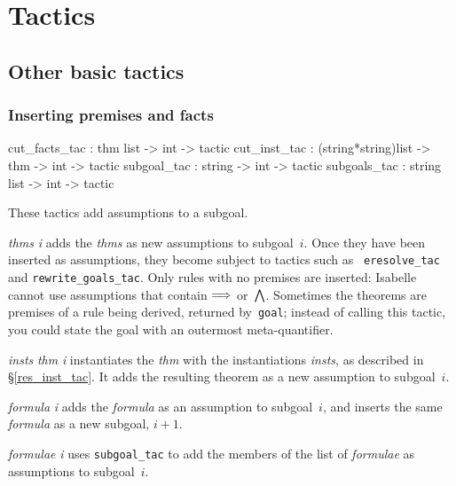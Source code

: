 
\chapter{Tactics} \label{tactics}

\section{Other basic tactics}

\subsection{Inserting premises and facts}\label{cut_facts_tac}
\begin{ttbox} 
cut_facts_tac : thm list -> int -> tactic
cut_inst_tac  : (string*string)list -> thm -> int -> tactic
subgoal_tac   : string -> int -> tactic
subgoals_tac  : string list -> int -> tactic
\end{ttbox}
These tactics add assumptions to a subgoal.
\begin{ttdescription}
\item[\ttindexbold{cut_facts_tac} {\it thms} {\it i}] 
  adds the {\it thms} as new assumptions to subgoal~$i$.  Once they have
  been inserted as assumptions, they become subject to tactics such as {\tt
    eresolve_tac} and {\tt rewrite_goals_tac}.  Only rules with no premises
  are inserted: Isabelle cannot use assumptions that contain $\Longrightarrow$
  or~$\bigwedge$.  Sometimes the theorems are premises of a rule being
  derived, returned by~{\tt goal}; instead of calling this tactic, you
  could state the goal with an outermost meta-quantifier.

\item[\ttindexbold{cut_inst_tac} {\it insts} {\it thm} {\it i}]
  instantiates the {\it thm} with the instantiations {\it insts}, as
  described in {\S}\ref{res_inst_tac}.  It adds the resulting theorem as a
  new assumption to subgoal~$i$. 

\item[\ttindexbold{subgoal_tac} {\it formula} {\it i}] 
adds the {\it formula} as an assumption to subgoal~$i$, and inserts the same
{\it formula} as a new subgoal, $i+1$.

\item[\ttindexbold{subgoals_tac} {\it formulae} {\it i}] 
  uses {\tt subgoal_tac} to add the members of the list of {\it
    formulae} as assumptions to subgoal~$i$. 
\end{ttdescription}


